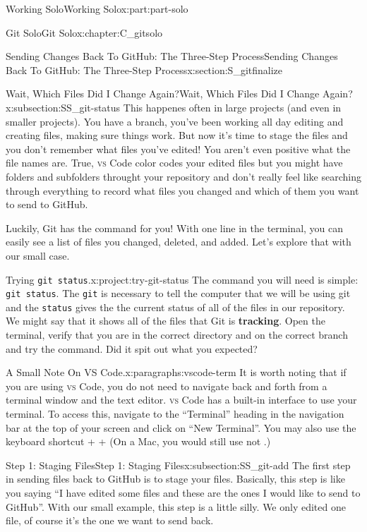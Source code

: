 \documentclass[oneside,10pt,]{book}
\newcommand{\mono}[1]{\texttt{#1}}
\newcommand{\initialism}[1]{\textsc{\MakeLowercase{#1}}}
\DeclareRobustCommand{\initialismintitle}[1]{\texorpdfstring{#1}{#1}}
\newcommand{\terminology}[1]{\textbf{#1}}
\newcommand{\kbd}[1]{\keys{{#1}}}
\begin{document}
\begin{partptx}{Working Solo}{}{Working Solo}{}{}{x:part:part-solo}
\begin{chapterptx}{Git Solo}{}{Git Solo}{}{}{x:chapter:C_gitsolo}
\begin{sectionptx}{Sending Changes Back To GitHub: The Three-Step Process}{}{Sending Changes Back To GitHub: The Three-Step Process}{}{}{x:section:S_gitfinalize}
\begin{subsectionptx}{Wait, Which Files Did I Change Again?}{}{Wait, Which Files Did I Change Again?}{}{}{x:subsection:SS_git-status}
%
This happenes often in large projects (and even in smaller projects). You have a branch, you've been working all day editing and creating files, making sure things work. But now it's time to stage the files and you don't remember what files you've edited! You aren't even positive what the file names are. True, \initialism{VS} Code color codes your edited files but you might have folders and subfolders throught your repository and don't really feel like searching through everything to record what files you changed and which of them you want to send to GitHub.%
\par
Luckily, Git has the command for you! With one line in the terminal, you can easily see a list of files you changed, deleted, and added. Let's explore that with our small case.%
\begin{project}{Trying \mono{git status}.}{x:project:try-git-status}%
The command you will need is simple: \mono{git status}. The \mono{git} is necessary to tell the computer that we will be using git and the \mono{status} gives the the current status of all of the files in our repository. We might say that it shows all of the files that Git is \terminology{tracking}. Open the terminal, verify that you are in the correct directory and on the correct branch and try the command. Did it spit out what you expected?%
\end{project}%
\begin{paragraphs}{A Small Note On \initialismintitle{VS} Code.}{x:paragraphs:vscode-term}%
It is worth noting that if you are using \initialism{VS} Code, you do not need to navigate back and forth from a terminal window and the text editor. \initialism{VS} Code has a built-in interface to use your terminal. To access this, navigate to the ``Terminal'' heading in the navigation bar at the top of your screen and click on ``New Terminal''. You may also use the keyboard shortcut \kbd{Ctrl} + \kbd{Shift} + \kbd{\textasciigrave{}} (On a Mac, you would still use \kbd{Ctrl} not \kbd{command}.)%
\end{paragraphs}%
\end{subsectionptx}
%
%
\typeout{************************************************}
\typeout{************************************************}
%
\begin{subsectionptx}{Step 1: Staging Files}{}{Step 1: Staging Files}{}{}{x:subsection:SS_git-add}
%
%
%
The first step in sending files back to GitHub is to stage your files. Basically, this step is like you saying ``I have edited some files and these are the ones I would like to send to GitHub''. With our small example, this step is a little silly. We only edited one file, of course it's the one we want to send back.%

\end{subsectionptx}
\end{sectionptx}
\end{chapterptx}
\end{partptx}
\end{document}

